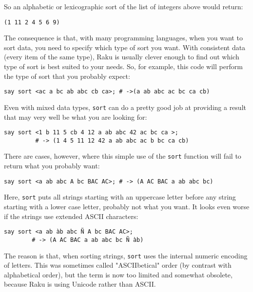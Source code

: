 So an alphabetic or lexicographic sort of the list of 
integers above would return:

\begin{verbatim}
(1 11 2 4 5 6 9)
\end{verbatim}

The consequence is that, with many programming languages, 
when you want to sort data, you need to specify which 
type of sort you want. With consistent data (every item 
of the same type), Raku is usually clever enough to 
find out which type of sort is best suited to your 
needs. So, for example, this code will perform 
the type of sort that you probably expect:

\begin{verbatim}
say sort <ac a bc ab abc cb ca>; # ->(a ab abc ac bc ca cb)
\end{verbatim}

Even with mixed data types, {\tt sort} can do a pretty good 
job at providing a result that may very well be what 
you are looking for:

\begin{verbatim}
say sort <1 b 11 5 cb 4 12 a ab abc 42 ac bc ca >;
         # -> (1 4 5 11 12 42 a ab abc ac b bc ca cb)
\end{verbatim}

There are cases, however, where this simple use of the 
{\tt sort} function will fail to return what you 
probably want:

\begin{verbatim}
say sort <a ab abc A bc BAC AC>; # -> (A AC BAC a ab abc bc)
\end{verbatim}
%

Here, {\tt sort} puts all strings starting with an 
uppercase letter before any string starting with a 
lower case letter, probably not what you want. It 
looks even worse if the strings use extended 
ASCII characters:

\begin{verbatim}
say sort <a ab àb abc Ñ A bc BAC AC>;
        # -> (A AC BAC a ab abc bc Ñ àb)
\end{verbatim}
%

The reason is that, when sorting strings, {\tt sort} 
uses the internal numeric encoding of letters. This 
was sometimes called "ASCIIbetical" order (by contrast 
with alphabetical order), but the term is now too limited 
and somewhat obsolete, because Raku is using Unicode 
rather than ASCII. 

